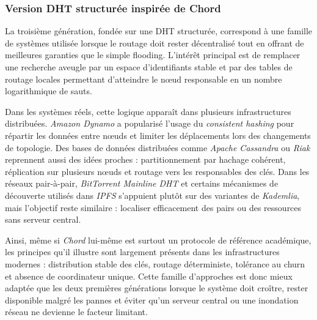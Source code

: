 \subsubsection{Version DHT structurée inspirée de Chord}

La troisième génération, fondée sur une DHT structurée, correspond à une famille de systèmes utilisée lorsque le routage doit rester décentralisé tout en offrant de meilleures garanties que le simple flooding. L'intérêt principal est de remplacer une recherche aveugle par un espace d'identifiants stable et par des tables de routage locales permettant d'atteindre le n\oe ud responsable en un nombre logarithmique de sauts.

Dans les systèmes réels, cette logique apparaît dans plusieurs infrastructures distribuées. \textit{Amazon Dynamo} a popularisé l'usage du \textit{consistent hashing} pour répartir les données entre n\oe uds et limiter les déplacements lors des changements de topologie. Des bases de données distribuées comme \textit{Apache Cassandra} ou \textit{Riak} reprennent aussi des idées proches : partitionnement par hachage cohérent, réplication sur plusieurs n\oe uds et routage vers les responsables des clés. Dans les réseaux pair-à-pair, \textit{BitTorrent Mainline DHT} et certains mécanismes de découverte utilisés dans \textit{IPFS} s'appuient plutôt sur des variantes de \textit{Kademlia}, mais l'objectif reste similaire : localiser efficacement des pairs ou des ressources sans serveur central.

Ainsi, même si \textit{Chord} lui-même est surtout un protocole de référence académique, les principes qu'il illustre sont largement présents dans les infrastructures modernes : distribution stable des clés, routage déterministe, tolérance au churn et absence de coordinateur unique. Cette famille d'approches est donc mieux adaptée que les deux premières générations lorsque le système doit croître, rester disponible malgré les pannes et éviter qu'un serveur central ou une inondation réseau ne devienne le facteur limitant.
